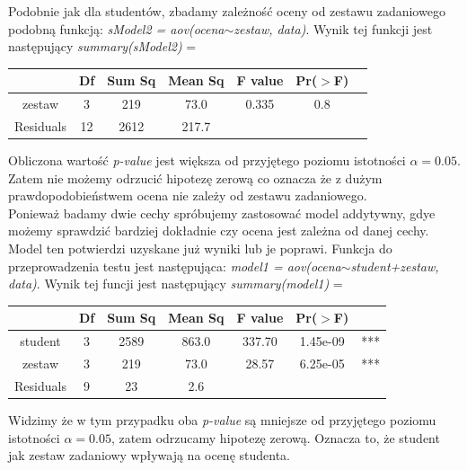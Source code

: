 \documentclass{article}
\begin{document}
Podobnie jak dla studentów, zbadamy zależność oceny od zestawu zadaniowego podobną funkcją: \textit{sModel2 = aov(ocena$\sim$zestaw, data)}. Wynik tej funkcji jest następujący \textit{summary(sModel2)} =
\begin{center} \begin{tabular}{|c|c|c|c|c|c|c|} \hline
& Df & Sum Sq & Mean Sq & F value & Pr($>$F) & \\ \hline
zestaw & 3 & 219 & 73.0 & 0.335 & 0.8 & \\ \hline
Residuals & 12 & 2612 & 217.7 & & & \\ \hline
\end{tabular} \end{center}
Obliczona wartość \textit{p-value} jest większa od przyjętego poziomu istotności $\alpha = 0.05$. Zatem nie możemy odrzucić hipotezę zerową co oznacza że z dużym prawdopodobieństwem ocena nie zależy od zestawu zadaniowego. \\

Ponieważ badamy dwie cechy spróbujemy zastosować model addytywny, gdye możemy sprawdzić bardziej dokładnie czy ocena jest zależna od danej cechy. Model ten potwierdzi uzyskane już wyniki lub je poprawi. Funkcja do przeprowadzenia testu jest następująca: \textit{model1 = aov(ocena$\sim$student+zestaw, data)}. Wynik tej funcji jest następujący \textit{summary(model1)} =
\begin{center} \begin{tabular}{|c|c|c|c|c|c|c|} \hline
& Df & Sum Sq & Mean Sq & F value & Pr($>$F) & \\ \hline
student & 3 & 2589 & 863.0 & 337.70 & 1.45e-09 & *** \\ \hline
zestaw & 3 & 219 & 73.0 & 28.57 & 6.25e-05 & *** \\ \hline
Residuals & 9 & 23 & 2.6 & & & \\ \hline
\end{tabular} \end{center}
Widzimy że w tym przypadku oba \textit{p-value} są mniejsze od przyjętego poziomu istotności $\alpha = 0.05$, zatem odrzucamy hipotezę zerową. Oznacza to, że student jak zestaw zadaniowy wpływają na ocenę studenta. \\
\end{document}
